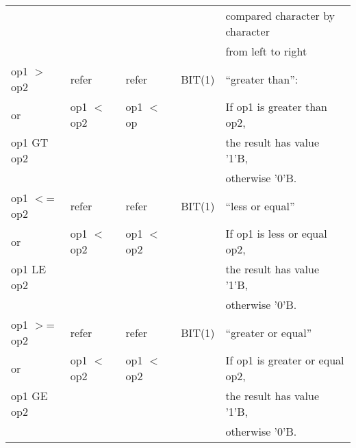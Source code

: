 \begin{table}
\begin{center}
\begin{tabular}{|l|l|l|l|l|}
                 &                 &                 &                      & compared character by character \\
                 &                 &                 &                      & from left to right \\ \hline
op1 $>$ op2      & refer         & refer         & BIT(1)               & ``greater than'':\\
or               & op1 $<$ op2     & op1 $<$ op      &                      & If op1 is greater than op2,\\
op1 GT op2       &                 &                 &                      & the result has value '1'B,\\
                 &                 &                 &                      & otherwise '0'B.\\ \hline

op1 $<$= op2     & refer         & refer         & BIT(1)               & ``less or equal''\\
or               & op1 $<$ op2     & op1 $<$ op2     &                      & If op1 is less or equal op2,\\
op1 LE op2       &                 &                 &                      & the result has value '1'B,\\
                 &                 &                 &                      & otherwise '0'B.\\ \hline

op1 $>$= op2     & refer         & refer         & BIT(1)               & ``greater or equal''\\
or               & op1 $<$ op2     & op1 $<$ op2     &                      & If op1 is greater or equal op2,\\
op1 GE op2       &                 &                 &                      & the result has value '1'B,\\
                 &                 &                 &                      & otherwise '0'B.\\ \hline


\end{tabular}
\end{center}
\end{table}
